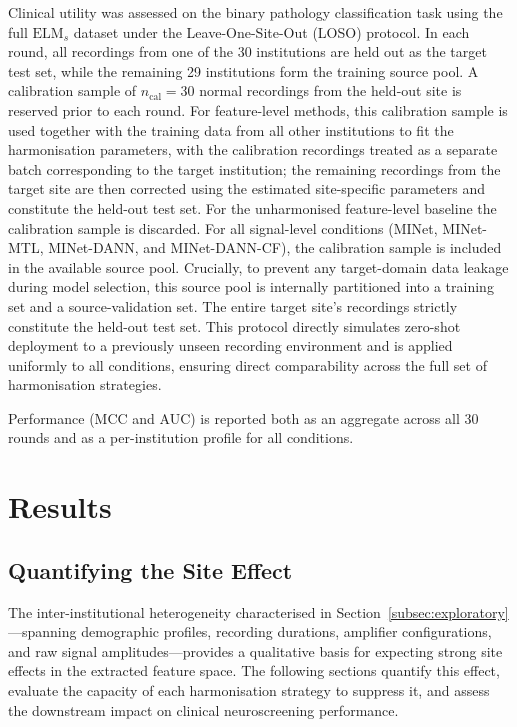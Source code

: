 \documentclass[preprint,12pt]{elsarticle}
\begin{document}
Clinical utility was assessed on the binary pathology classification
task using the full $\mathrm{ELM}_s$ dataset under the
Leave-One-Site-Out (LOSO) protocol.
In each round, all recordings from one of the 30 institutions are
held out as the target test set, while the remaining 29 institutions
form the training source pool.
A calibration sample of $n_{\mathrm{cal}} = 30$ normal recordings
from the held-out site is reserved prior to each round.
For feature-level methods, this calibration sample is used together
with the training data from all other institutions to fit the
harmonisation parameters, with the calibration recordings treated as
a separate batch corresponding to the target institution; the
remaining recordings from the target site are then corrected using
the estimated site-specific parameters and constitute the held-out
test set.
For the unharmonised feature-level baseline
the calibration sample is discarded.
For all signal-level conditions (MINet, MINet-MTL, MINet-DANN, and MINet-DANN-CF), the calibration sample is included in the available source pool. Crucially, to prevent any target-domain data leakage during model selection, this source pool is internally partitioned into a training set and a source-validation set. The entire target site's recordings strictly constitute the held-out test set. This protocol directly simulates zero-shot deployment to a previously unseen recording environment and is applied uniformly to all conditions, ensuring direct comparability across the full set of harmonisation strategies.

Performance (MCC and AUC) is reported both as an aggregate across
all 30 rounds and as a per-institution profile for all conditions.

\section{Results}
\label{sec:results}


\subsection{Quantifying the Site Effect}
\label{subsec:site_classification}
The inter-institutional heterogeneity characterised in
Section~\ref{subsec:exploratory}---spanning demographic profiles,
recording durations, amplifier configurations, and raw signal
amplitudes---provides a qualitative basis for expecting strong
site effects in the extracted feature space.
The following sections quantify this effect, evaluate the capacity
of each harmonisation strategy to suppress it, and assess the
downstream impact on clinical neuroscreening performance.
\end{document}
